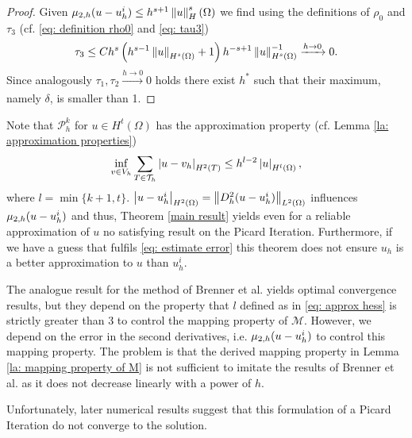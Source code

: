 \begin{proof}
	Given $\mu_{2,h}(u-u_h^i) \leq h^{s+1} \left\lVert u \right\rVert_H^s(\Omega)$ we find using the definitions of $\rho_0$ and $\tau_3$ (cf. \eqref{eq: definition rho0} and \eqref{eq: tau3})
	\begin{align*}
		\tau_3  \leq C h^{s} \left(h^{s-1} \left\lVert u \right\rVert_{H^s(\Omega)}+1\right) h^{-s+1} \left\lVert u \right\rVert_{H^{s}(\Omega)}^{-1} \xrightarrow{h \rightarrow 0}  0.
	\end{align*}
	Since analogously $\tau_1, \tau_2 \xrightarrow[]{h\rightarrow 0} 0$ holds there exist $h^*$ such that their maximum, namely $\delta$, is smaller than 1.
\end{proof}
	
Note that $\mathcal P^k_h$ for $u \in H^t(\Omega)$ has the approximation property  (cf. Lemma \ref{la: approximation properties})
\begin{align}
	\inf_{v \in V_h} \sum_{T \in \mathcal{T}_h} \left| u-v_h \right|_{H^2(T)} \leq h^{l-2} \left| u \right|_{H^l(\Omega)}, \label{eq: approx hess}
\end{align}
where $l = \min\{k+1,t\}$. $\left| u-u^i_h \right|_{H^2(\Omega)} = \left\lVert D_h^2 (u-u^i_h) \right\rVert_{L^2(\Omega)}$ influences $\mu_{2,h}(u-u^i_h)$ and thus, Theorem \ref{main result} yields even for a reliable approximation of $u$ no satisfying result on the Picard Iteration. Furthermore, if we have a guess that fulfils \eqref{eq: estimate error} this theorem does not ensure $u_h$ is a better approximation to $u$ than $u^i_h$. 

The analogue result for the method of Brenner et al. \cite[Theorem 3.1]{BGN+2011} yields optimal convergence results, but they depend on the property that $l$ defined as in \eqref{eq: approx hess} is strictly greater than $3$ to control the mapping property of $\mathcal M$. However, we depend on the error in the second derivatives, i.e. $\mu_{2,h}(u-u_h^i)$ to control this mapping property. The problem is that the derived mapping property in Lemma \ref{la: mapping property of M} is not sufficient to imitate the results of Brenner et al. as it does not decrease linearly with a power of $h$.

Unfortunately, later numerical results suggest that this formulation of a Picard Iteration do not converge to the \MA solution.	
	
